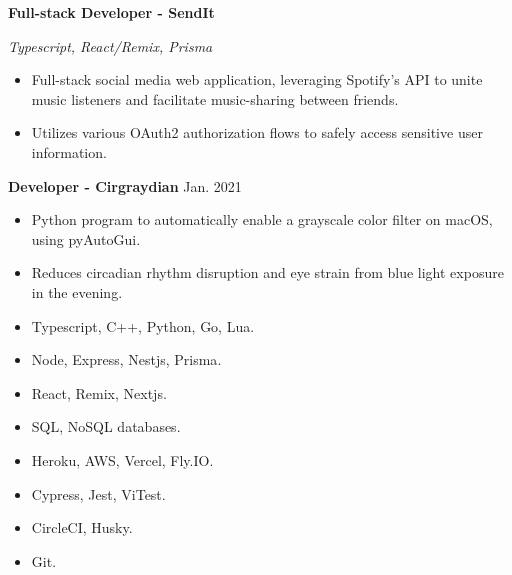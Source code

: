 \documentclass[12pt]{article}
\begin{document}
\begin{flushleft}

  \hrulefill {} \quad \hrulefill

  \vspace{2mm}
   
  {\textbf{Full-stack Developer - SendIt}} 

  \textit{Typescript, React/Remix, Prisma}

  \vspace{-2mm}

  \begin{itemize} \setlength\itemsep{-0.3em}
    \item Full-stack social media web application, leveraging Spotify's API to unite music listeners and facilitate music-sharing between friends.
    \item Utilizes various OAuth2 authorization flows to safely access sensitive user information.
  \end{itemize}

  {\textbf{Developer - Cirgraydian}} \hfill Jan. 2021
  \vspace{-2mm}
  \begin{itemize} \setlength\itemsep{-0.3em}
    \item Python program to automatically enable a grayscale color filter on macOS, using pyAutoGui.
    \item Reduces circadian rhythm disruption and eye strain from blue light exposure in the evening.
  \end{itemize}

\end{flushleft}


\begin{flushleft}
  \hrulefill {} \quad \hrulefill
  {\vspace{-1mm}}
  \begin{multicols}{2}
    \begin{itemize} \setlength\itemsep{-0.3em}\setlength\columnseprule{10pt}
      \item {Typescript, C++, Python, Go, Lua}.
      \item {Node, Express, Nestjs, Prisma}.
      \item {React, Remix, Nextjs}.
      \item {SQL, NoSQL databases}.
      \item {Heroku, AWS, Vercel, Fly.IO}. 
      \item {Cypress, Jest, ViTest}.
      \item {CircleCI, Husky}.
      \item {Git}.
    \end{itemize}  
  \end{multicols}
\end{flushleft} 
\end{document}
